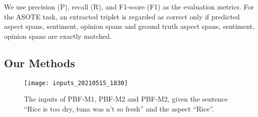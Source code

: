 \documentclass[11pt]{article}
\begin{document}
We use precision (P), recall (R), and F1-score (F1) as the evaluation metrics. For the ASOTE task, an extracted triplet is regarded as correct only if predicted aspect spans, sentiment, opinion spans and ground truth aspect spans, sentiment, opinion spans are exactly matched.

\subsection{Our Methods}

\begin{figure}
	\centering
	\texttt{[image: inputs\_20210515\_1830]}
	\caption{The inputs of PBF-M1, PBF-M2 and PBF-M2, given the sentence ``Rice is too dry, tuna was n't so fresh'' and the aspect ``Rice''.}
	\label{fig:inputs}
\end{figure}
\end{document}
